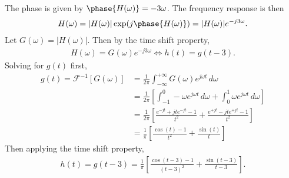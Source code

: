\documentclass{report}
\begin{document}
\begin{solution}
    The phase is given by $\phase{H(\omega)}=-3\omega$. The frequency response is then 
    \begin{align*}
        H(\omega) = |H(\omega)|\exp(j\phase{H(\omega)}) = |H(\omega)|e^{-j3\omega}.
    \end{align*}
    Let $G(\omega)=|H(\omega)|$. Then by the time shift property, 
    \begin{align*}
        H(\omega) = G(\omega)e^{-j3\omega} \iff h(t) = g(t-3).
    \end{align*}
    Solving for $g(t)$ first,
    \begin{align*}
        g(t) = \mathcal{F}^{-1}[G(\omega)] &= \frac{1}{2\pi}\int_{-\infty}^{+\infty} G(\omega)e^{j\omega t} \,d\omega \\
        &= \frac{1}{2\pi}\left[\int_{-1}^{0} -\omega e^{j\omega t} \,d\omega + \int_{0}^{1} \omega e^{j\omega t} \,d\omega\right] \\
        &= \frac{1}{2\pi}\left[\frac{e^{-jt}+jte^{-jt}-1}{t^2} + \frac{e^{+jt}-jte^{+jt}-1}{t^2}\right] \\ 
        &= \frac{1}{\pi}\left[\frac{\cos(t)-1}{t^2} + \frac{\sin(t)}{t}\right]
    \end{align*}
    Then applying the time shift property,
    \begin{align*}
        h(t) = g(t-3) = \frac{1}{\pi}\left[\frac{\cos(t-3)-1}{(t-3)^2} + \frac{\sin(t-3)}{t-3}\right].
    \end{align*}
\end{solution}
\end{document}
